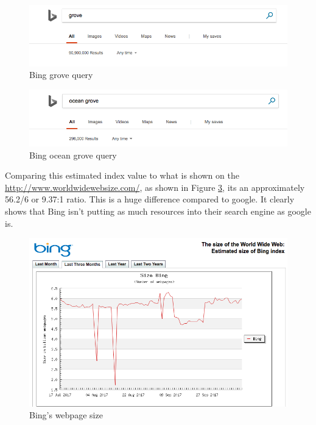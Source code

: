 \documentclass[letterpaper,11pt]{article}
\begin{document}
\begin{figure}[h]
\centering
\includegraphics[scale=0.4]{bing2.png}
\caption{Bing grove query}
\label{fig:q3b2}
\end{figure}

\begin{figure}[h]
\centering
\includegraphics[scale=0.4]{bing3.png}
\caption{Bing ocean grove query}
\label{fig:q3b3}
\end{figure}


Comparing this estimated index value to what is shown on the \url{http://www.worldwidewebsize.com/}, as shown in Figure \ref{fig:q3bwww}, its an approximately 56.2/6 or 
9.37:1 ratio. 
This is a huge difference compared to google.  
It clearly shows that Bing isn't putting as much resources into their search engine as google is.
  
\begin{figure}[h]
\centering
\includegraphics[scale=0.4]{bingwww.png}
\caption{Bing's webpage size}
\label{fig:q3bwww}
\end{figure}
\end{document}
